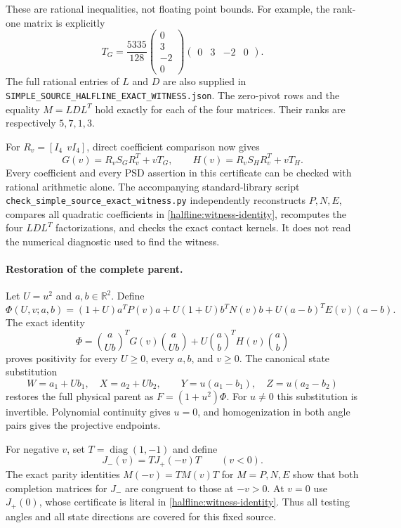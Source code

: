These are rational inequalities, not floating point bounds.
For example, the rank-one matrix is explicitly
\[
 T_G=\frac{5335}{128}
 \begin{pmatrix}0\\3\\-2\\0\end{pmatrix}
 \begin{pmatrix}0&3&-2&0\end{pmatrix}.
\]
The full rational entries of $L$ and $D$ are also supplied in
\texttt{SIMPLE\_SOURCE\_HALFLINE\_EXACT\_WITNESS.json}.
The zero-pivot rows and the equality $M=LDL^T$ hold exactly for each
of the four matrices. Their ranks are respectively $5,7,1,3$.

For $R_v=[I_4\ \ vI_4]$, direct coefficient comparison now gives
\begin{equation}
 G(v)=R_vS_GR_v^T+vT_G,\qquad
 H(v)=R_vS_HR_v^T+vT_H.                               \label{halfline:witness-identity}
\end{equation}
Every coefficient and every PSD assertion in this certificate can be
checked with rational arithmetic alone. The accompanying standard-library
script \texttt{check\_simple\_source\_exact\_witness.py} independently
reconstructs $P,N,E$, compares all quadratic coefficients in
\eqref{halfline:witness-identity}, recomputes the four $LDL^T$
factorizations, and checks the exact contact kernels. It does not read
the numerical diagnostic used to find the witness.

\paragraph{Restoration of the complete parent.}
Let $U=u^2$ and $a,b\in\mathbb R^2$. Define
\[
 \Phi(U,v;a,b)=(1+U)a^TP(v)a+U(1+U)b^TN(v)b
                  +U(a-b)^TE(v)(a-b).
\]
The exact identity
\[
 \Phi=
 \binom a{Ub}^{\!T}G(v)\binom a{Ub}
       +U\binom ab^{\!T}H(v)\binom ab
\]
proves positivity for every $U\ge0$, every $a,b$, and $v\ge0$.
The canonical state substitution
\[
 W=a_1+Ub_1,\quad X=a_2+Ub_2,\qquad
 Y=u(a_1-b_1),\quad Z=u(a_2-b_2)
\]
restores the full physical parent as $F=(1+u^2)\Phi$.
For $u\ne0$ this substitution is invertible. Polynomial continuity
gives $u=0$, and homogenization in both angle pairs gives the
projective endpoints.

For negative $v$, set $T=\operatorname{diag}(1,-1)$ and define
\begin{equation}
 J_-(v)=T J_+(-v)T\qquad(v<0).                         \label{halfline:witness-negative}
\end{equation}
The exact parity identities $M(-v)=TM(v)T$ for $M=P,N,E$ show that
both completion matrices for $J_-$ are congruent to those at $-v>0$.
At $v=0$ use $J_+(0)$, whose certificate is literal in
\eqref{halfline:witness-identity}. Thus all testing angles and all
state directions are covered for this fixed source.

